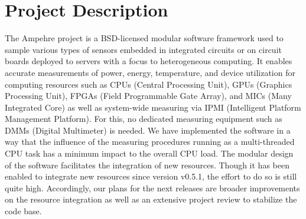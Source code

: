 %
%
%
%
%
%

\section{Project Description}
The Ampehre project is a BSD-licensed modular software framework used to sample various types of sensors embedded in integrated circuits or on circuit boards deployed to servers with a focus to heterogeneous computing. It enables accurate measurements of power, energy, temperature, and device utilization for computing resources such as CPUs (Central Processing Unit), GPUs (Graphics Processing Unit), FPGAs (Field Programmable Gate Array), and MICs (Many Integrated Core) as well as system-wide measuring via IPMI (Intelligent Platform Management Platform). For this, no dedicated measuring equipment such as DMMs (Digital Multimeter) is needed. We have implemented the software in a way that the influence of the measuring procedures running as a multi-threaded CPU task has a minimum impact to the overall CPU load. The modular design of the software facilitates the integration of new resources. Though it has been enabled to integrate new resources since version v0.5.1, the effort to do so is still quite high. Accordingly, our plans for the next releases are broader improvements on the resource integration as well as an extensive project review to stabilize the code base.
